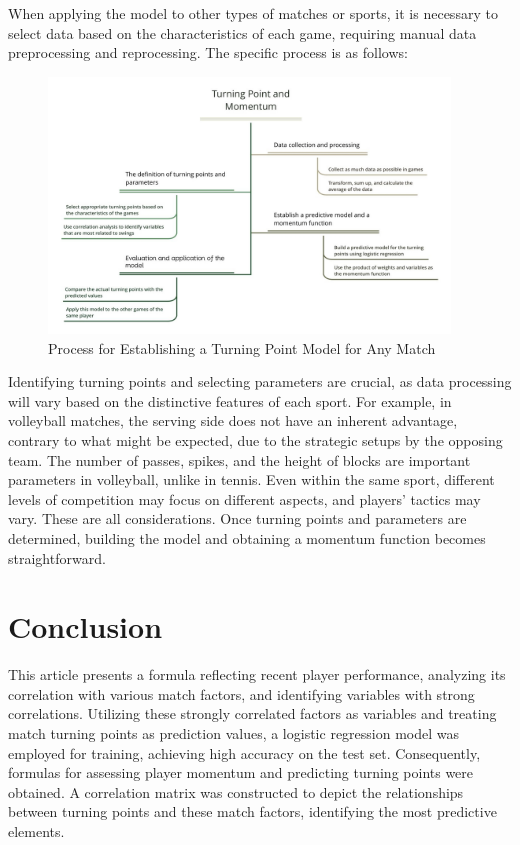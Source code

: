 \documentclass[UTF8]{ctexart} %
\begin{document}
When applying the model to other types of matches or sports, it is necessary to select data based on the 
characteristics of each game, requiring manual data preprocessing and reprocessing. The specific process is as follows:

\begin{figure}[H]
    \centering
    \includegraphics[width=0.95\textwidth]{./graph/flow_chart.jpg}
    \caption{Process for Establishing a Turning Point Model for Any Match}
\end{figure}

Identifying turning points and selecting parameters are crucial, as data processing will vary based on the 
distinctive features of each sport. For example, in volleyball matches, the serving side does not have an 
inherent advantage, contrary to what might be expected, due to the strategic setups by the opposing team. 
The number of passes, spikes, and the height of blocks are important parameters in volleyball, unlike in 
tennis. Even within the same sport, different levels of competition may focus on different aspects, and 
players' tactics may vary. These are all considerations. Once turning points and parameters are determined, 
building the model and obtaining a momentum function becomes straightforward.



\section{Conclusion}
This article presents a formula reflecting recent player performance, analyzing its correlation with various match factors, and identifying variables with strong correlations. 
Utilizing these strongly correlated factors as variables and treating match turning points as prediction values, a logistic regression model was employed for training, 
achieving high accuracy on the test set. Consequently, formulas for assessing player momentum and predicting turning points were obtained. 
A correlation matrix was constructed to depict the relationships between turning points and these match factors, identifying the most predictive elements.
\end{document}
